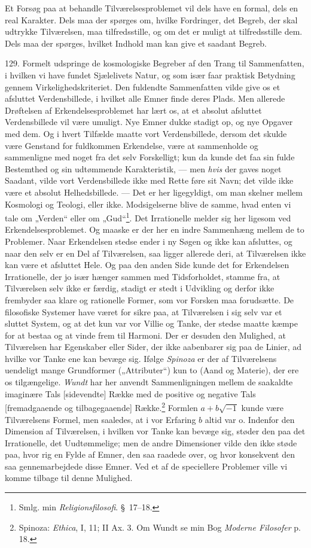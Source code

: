\documentclass[12pt,a4paper]{book}
\newcommand{\apage}[1]{\marginnote{\footnotesize\textit{[#1]}}}
\begin{document}
Et Forsøg paa at behandle Tilværelsesproblemet vil dels have en formal, dels en real
Karakter. Dels maa der spørges om, hvilke Fordringer, det Begreb, der skal udtrykke
Tilværelsen, maa tilfredsstille, og om det er muligt at tilfredsstille dem. Dels maa
der spørges, hvilket Indhold man kan give et saadant Begreb.

129. Formelt udspringe de kosmologiske Begreber af den Trang til Sammenfatten, i
hvilken vi have fundet Sjælelivets Natur, og som især faar praktisk Betydning gennem
Virkelighedskriteriet. Den fuldendte Sammenfatten vilde give os et afsluttet
Verdensbillede, i hvilket alle Emner finde deres Plads. Men allerede Drøftelsen af
Erkendelsesproblemet har lært os, at et absolut afsluttet Verdensbillede vil være
umuligt. Nye Emner dukke stadigt op, og nye Opgaver med dem. Og i hvert Tilfælde
maatte vort Verdensbillede, dersom det skulde være Genstand for fuldkommen Erkendelse,
være at sammenholde og sammenligne med noget fra det selv Forskelligt; kun da kunde
det faa sin fulde Bestemthed og sin udtømmende Karakteristik, --- men \emph{hvis} der
gaves noget Saadant, vilde vort Verdensbillede ikke med Rette føre sit Navn; det vilde
ikke være et absolut Helhedsbillede. --- Det er her ligegyldigt, om man skelner mellem
Kosmologi og Teologi, eller ikke. Modsigelserne blive de samme, hvad enten vi tale om
„Verden“ eller om „Gud“\footnote{Smlg. min \emph{Religionsfilosofi}. \S\ 17--18.}. Det
Irrationelle melder sig her ligesom ved Erkendelsesproblemet. Og maaske er der her en
indre Sammenhæng mellem de to Problemer. Naar Erkendelsen stedse ender i ny Søgen og
ikke \apage{310} kan afsluttes, og naar den selv er en Del af Tilværelsen, saa ligger allerede
deri, at Tilværelsen ikke kan være et afsluttet Hele. Og paa den anden Side kunde det
for Erkendelsen Irrationelle, der jo især hænger sammen med Tidsforholdet, stamme fra,
at Tilværelsen selv ikke er færdig, stadigt er stedt i Udvikling og derfor ikke
frembyder saa klare og rationelle Former, som vor Forsken maa forudsætte. De
filosofiske Systemer have været for sikre paa, at Tilværelsen i sig selv var et
sluttet System, og at det kun var vor Villie og Tanke, der stedse maatte kæmpe for at
bestaa og at vinde frem til Harmoni. Der er desuden den Mulighed, at Tilværelsen har
Egenskaber eller Sider, der ikke aabenbarer sig paa de Linier, ad hvilke vor Tanke ene kan
bevæge sig. Ifølge \emph{Spinoza} er der af Tilværelsens uendeligt mange Grundformer
(„Attributer“) kun to (Aand og Materie), der ere os tilgængelige. \emph{Wundt} har her
anvendt Sammenligningen mellem de saakaldte imaginære Tals [sidevendte] Række med de
positive og negative Tals [fremadgaaende og tilbagegaaende] Række.\footnote{Spinoza:
\emph{Ethica}, I, 11; II Ax. 3. Om Wundt se min Bog \emph{Moderne Filosofer} p. 18.}
Formlen $a+b\sqrt{-1}$ kunde være Tilværelsens Formel, men saaledes, at i vor Erfaring
$b$ altid var o. Indenfor den Dimension af Tilværelsen, i hvilken vor Tanke kan bevæge
sig, støder den paa det Irrationelle, det Uudtømmelige; men de andre Dimensioner vilde
den ikke støde paa, hvor rig en Fylde af Emner, den saa raadede over, og hvor
konsekvent den saa gennemarbejdede disse Emner. Ved et af de speciellere Problemer
ville vi komme tilbage til denne Mulighed.
\end{document}
